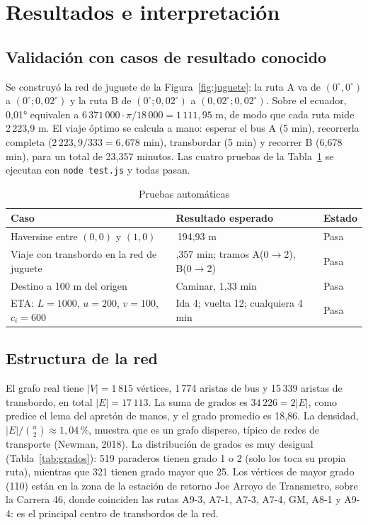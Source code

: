 \documentclass[12pt,letterpaper]{article}
\begin{document}
\section{Resultados e interpretación}\label{sec:res}

\subsection{Validación con casos de resultado conocido}
Se construyó la red de juguete de la Figura~\ref{fig:juguete}: la ruta A va de $(0^\circ,0^\circ)$ a $(0^\circ;0{,}02^\circ)$ y la ruta B de $(0^\circ;0{,}02^\circ)$ a $(0{,}02^\circ;0{,}02^\circ)$. Sobre el ecuador, 0,01° equivalen a $6\,371\,000\cdot\pi/18\,000=1\,111{,}95$ m, de modo que cada ruta mide 2\,223,9 m. El viaje óptimo se calcula a mano: esperar el bus A (5 min), recorrerla completa ($2\,223{,}9/333=6{,}678$ min), transbordar (5 min) y recorrer B (6,678 min), para un total de 23,357 minutos. Las cuatro pruebas de la Tabla~\ref{tab:pruebas} se ejecutan con \texttt{node test.js} y todas pasan.

\begin{table}[H]
\centering
\caption{Pruebas automáticas}\label{tab:pruebas}
\begin{tabular}{>{\raggedright\arraybackslash}p{6.4cm}>{\raggedright\arraybackslash}p{6.2cm}l}
\toprule
Caso & Resultado esperado & Estado \\
\midrule
Haversine entre $(0,0)$ y $(1,0)$ & 111\,194,93 m & Pasa \\
Viaje con transbordo en la red de juguete & 23,357 min; tramos A(0$\to$2), B(0$\to$2) & Pasa \\
Destino a 100 m del origen & Caminar, 1,33 min & Pasa \\
ETA: $L=1000$, $u=200$, $v=100$, $c_i=600$ & Ida 4; vuelta 12; cualquiera 4 min & Pasa \\
\bottomrule
\end{tabular}
\end{table}

\subsection{Estructura de la red}
El grafo real tiene $|V|=1\,815$ vértices, 1\,774 aristas de bus y 15\,339 aristas de transbordo, en total $|E|=17\,113$. La suma de grados es $34\,226=2|E|$, como predice el lema del apretón de manos, y el grado promedio es 18,86. La densidad, $|E|/\binom{n}{2}\approx 1{,}04$\,\%, muestra que es un grafo disperso, típico de redes de transporte (Newman, 2018). La distribución de grados es muy desigual (Tabla~\ref{tab:grados}): 519 paraderos tienen grado 1 o 2 (solo los toca su propia ruta), mientras que 321 tienen grado mayor que 25. Los vértices de mayor grado (110) están en la zona de la estación de retorno Joe Arroyo de Transmetro, sobre la Carrera 46, donde coinciden las rutas A9-3, A7-1, A7-3, A7-4, GM, A8-1 y A9-4: es el principal centro de transbordos de la red.
\end{document}
